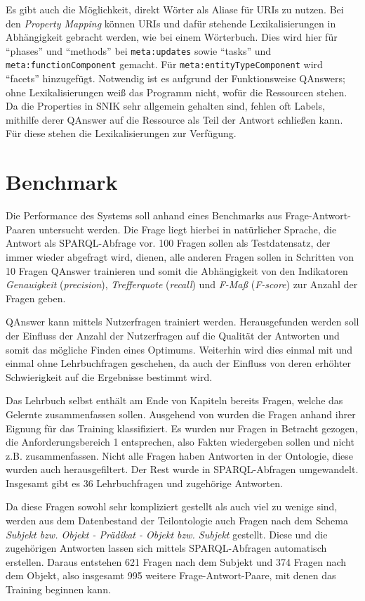 \documentclass[utf8,biblatex]{lni}
\begin{document}
Es gibt auch die Möglichkeit, direkt Wörter als Aliase für URIs zu nutzen.
Bei den \emph{Property Mapping} können URIs und dafür stehende Lexikalisierungen in Abhängigkeit gebracht werden, wie bei einem Wörterbuch.
Dies wird hier für \enquote{phases} und \enquote{methods} bei \texttt{meta:updates} sowie \enquote{tasks} und \texttt{meta:functionComponent} gemacht.
Für \texttt{meta:entityTypeComponent} wird \enquote{facets} hinzugefügt.
Notwendig ist es aufgrund der Funktionsweise QAnswers; ohne Lexikalisierungen weiß das Programm nicht, wofür die Ressourcen stehen.
Da die Properties in SNIK sehr allgemein gehalten sind, fehlen oft Labels, mithilfe derer QAnswer auf die Ressource als Teil der Antwort schließen kann.
Für diese stehen die Lexikalisierungen zur Verfügung.

\section{Benchmark}

Die Performance des Systems soll anhand eines Benchmarks aus Frage-Antwort-Paaren untersucht werden.
Die Frage liegt hierbei in natürlicher Sprache, die Antwort als SPARQL-Abfrage vor.
100 Fragen sollen als Testdatensatz, der immer wieder abgefragt wird, dienen,
alle anderen Fragen sollen in Schritten von 10 Fragen QAnswer trainieren und somit die Abhängigkeit von den Indikatoren \emph{Genauigkeit} (\emph{precision}), \emph{Trefferquote} (\emph{recall}) und \emph{F-Maß} (\emph{F-score}) zur Anzahl der Fragen geben.

QAnswer kann mittels Nutzerfragen trainiert werden.
Herausgefunden werden soll der Einfluss der Anzahl der Nutzerfragen auf die Qualität der Antworten und somit das mögliche Finden eines Optimums.
Weiterhin wird dies einmal mit und einmal ohne Lehrbuchfragen geschehen, da auch der Einfluss von deren erhöhter Schwierigkeit auf die Ergebnisse bestimmt wird.

Das Lehrbuch selbst \cite{bb} enthält am Ende von Kapiteln bereits Fragen, welche das Gelernte zusammenfassen sollen.
Ausgehend von \cite{arneba} wurden die Fragen anhand ihrer Eignung für das Training klassifiziert.
Es wurden nur Fragen in Betracht gezogen, die Anforderungsbereich 1 entsprechen, also Fakten wiedergeben sollen und nicht z.B. zusammenfassen.
Nicht alle Fragen haben Antworten in der Ontologie, diese wurden auch herausgefiltert.
Der Rest wurde in SPARQL-Abfragen umgewandelt.
Insgesamt gibt es 36 Lehrbuchfragen und zugehörige Antworten.

Da diese Fragen sowohl sehr kompliziert gestellt als auch viel zu wenige sind, werden aus dem Datenbestand der Teilontologie auch Fragen nach dem Schema \emph{Subjekt bzw. Objekt - Prädikat - Objekt bzw. Subjekt} gestellt.
Diese und die zugehörigen Antworten lassen sich mittels SPARQL-Abfragen automatisch erstellen.
Daraus entstehen 621 Fragen nach dem Subjekt und 374 Fragen nach dem Objekt, also insgesamt 995 weitere Frage-Antwort-Paare, mit denen das Training beginnen kann.
\end{document}
